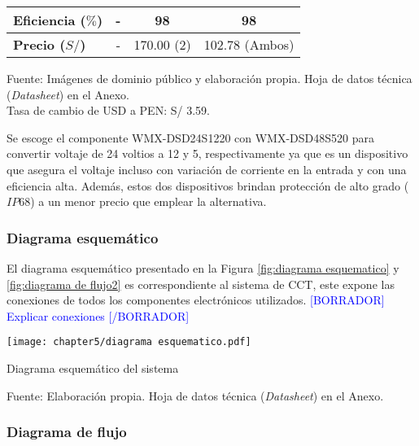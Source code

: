 \begin{savenotes}
\begin{mytable}[H]
\begin{tabular}{l|c|c|c|}
{\begin{minipage}{\myforthmaxsizeofcontenttable}
					\textbf{Eficiencia ($\%$)}
				\end{minipage}
			} & - & 98 & 98 \\ \hline
			\multicolumn{1}{|l|}{
				\begin{minipage}{\myforthmaxsizeofcontenttable}	
					\textbf{Precio ($S/$)}
				\end{minipage}
			} & - & 170.00 (2) & 102.78 (Ambos)  \\ \hline		
		\end{tabular}
		\begin{myflushcenteraftertable}	
			Fuente: Imágenes de dominio público y elaboración propia. Hoja de datos técnica (\textit{Datasheet}) en el Anexo.\\
			Tasa de cambio de USD a PEN: S/ 3.59.
		\end{myflushcenteraftertable}
	\end{mytable}
\end{savenotes}

Se escoge el componente WMX-DSD24S1220 con WMX-DSD48S520 para convertir voltaje de 24 voltios a 12 y 5, respectivamente ya que es un dispositivo que asegura el voltaje incluso con variación de corriente en la entrada y con una eficiencia alta. Además, estos dos dispositivos brindan protección de alto grado ($IP68$) a un menor precio que emplear la alternativa.


\subsubsection{Diagrama esquemático} 

El diagrama esquemático presentado en la Figura \ref{fig:diagrama esquematico} y \ref{fig:diagrama de flujo2} es correspondiente al sistema de CCT, este expone las conexiones de todos los componentes electrónicos utilizados. \textcolor{blue}{[BORRADOR] Explicar conexiones [/BORRADOR]}

\begin{myfigure}[H]
	\footnotesize\centering
	\texttt{[image: chapter5/diagrama esquematico.pdf]}
	\caption{Diagrama esquemático del sistema}
	\begin{myflushcenter}
		Fuente: Elaboración propia. Hoja de datos técnica (\textit{Datasheet}) en el Anexo.
	\end{myflushcenter}
	\label{fig:diagrama esquematico}
\end{myfigure}

\subsubsection{Diagrama de flujo}


